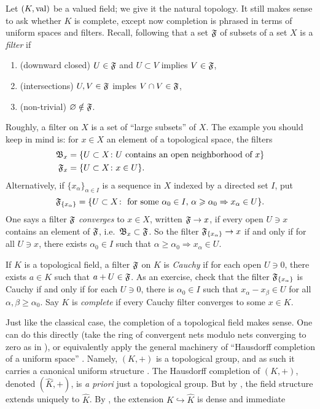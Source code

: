 Let $(K,\operatorname{val})$ be a valued field; we give it the natural topology. It 
still makes sense to ask whether $K$ is complete, except now completion is 
phrased in terms of uniform spaces and filters. Recall, following 
\cite[I \S 6.1]{bourbaki-gentop1} that a set $\mathfrak{F}$ of subsets of a set $X$ is 
a \emph{filter} if 
\begin{enumerate}
\item
(downward closed)
$U\in \mathfrak{F}$ and $U\subset V$ implies $V\in \mathfrak{F}$, 

\item
(intersections)
$U,V\in \mathfrak{F}$ imples $V\cap V\in \mathfrak{F}$, 

\item
(non-trivial)
$\varnothing\notin \mathfrak{F}$. 
\end{enumerate}
Roughly, a filter on $X$ is a set of ``large subsets'' of $X$. The example you 
should keep in mind is: for $x\in X$ an element of a topological space, the 
filters
\begin{align*}
  \mathfrak{B}_x &= \{U\subset X\colon U\text{ contains an open neighborhood of }x\} \\
  \mathfrak{F}_x &= \{U\subset X\colon x\in U\} .
\end{align*}
Alternatively, if $\{x_\alpha\}_{\alpha\in I}$ is a sequence in $X$ indexed by 
a directed set $I$, put 
\[
  \mathfrak{F}_{\{x_\alpha\}} = \{U\subset X\colon \text{ for some $\alpha_0\in I$, $\alpha\geqslant \alpha_0\Rightarrow x_\alpha\in U$}\} .
\]
One says a filter $\mathfrak{F}$ \emph{converges} to $x\in X$, written $\mathfrak{F}\to x$, if 
every open $U\ni x$ contains an element of $\mathfrak{F}$, i.e.~$\mathfrak{B}_x\subset \mathfrak{F}$. So 
the filter $\mathfrak{F}_{\{x_\alpha\}}\to x$ if and only if for all $U\ni x$, there 
exists $\alpha_0\in I$ such that 
$\alpha\geqslant \alpha_0\Rightarrow x_\alpha\in U$. 

If $K$ is a topological field, a filter $\mathfrak{F}$ on $K$ is \emph{Cauchy} if for 
each open $U\ni 0$, there exists $a\in K$ such that $a+U\in \mathfrak{F}$. As an 
exercise, check that the filter $\mathfrak{F}_{\{x_\alpha\}}$ is Cauchy if and only if 
for each $U\ni 0$, there is $\alpha_0\in I$ such that 
$x_\alpha-x_\beta\in U$ for all $\alpha,\beta\geqslant \alpha_0$. Say $K$ is 
\emph{complete} if every Cauchy filter converges to some $x\in K$. 

Just like the classical case, the completion of a topological field makes 
sense. One can do this directly (take the ring of convergent nets modulo nets 
converging to zero as in \cite[2.4.3]{engler-prestel}), or equivalently apply 
the general machinery of ``Hausdorff completion of a uniform space'' 
\cite[II \S 3.7]{bourbaki-gentop1}. Namely, $(K,+)$ is a topological group, 
and as such it carries a canonical uniform structure 
\cite[III \S 3]{bourbaki-gentop1}. The Hausdorff completion of $(K,+)$, denoted 
$(\widehat K,+)$, is \emph{a priori} just a topological group. But by 
\cite[III \S 6.8]{bourbaki-gentop1}, the field structure extends uniquely to 
$\widehat K$. By \cite[2.4.4]{engler-prestel}, the extension 
$K\hookrightarrow \widehat K$ is dense and immediate

